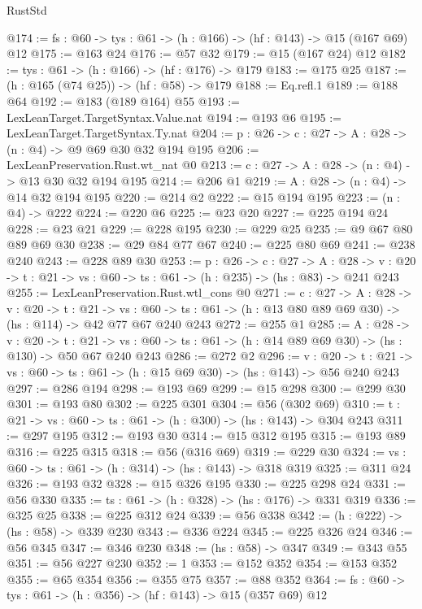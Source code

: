 \begin{lexlean}{RustStd}
\begin{coremodule}
@174 := {fs : @60} -> {tys : @61} -> (h : @166) -> (hf : @143) -> @15 (@167 @69) @12
@175 := @163 @24
@176 := @57 @32
@179 := @15 (@167 @24) @12
@182 := {tys : @61} -> (h : @166) -> (hf : @176) -> @179
@183 := @175 @25
@187 := (h : @165 (@74 @25)) -> (hf : @58) -> @179
@188 := Eq.refl.{1}
@189 := @188 @64
@192 := @183 (@189 @164) @55
@193 := LexLeanTarget.TargetSyntax.Value.nat
@194 := @193 @6
@195 := LexLeanTarget.TargetSyntax.Ty.nat
@204 := {p : @26} -> {c : @27} -> {A : @28} -> (n : @4) -> @9 @69 @30 @32 @194 @195
@206 := LexLeanPreservation.Rust.wt_nat @0
@213 := {c : @27} -> {A : @28} -> (n : @4) -> @13 @30 @32 @194 @195
@214 := @206 @1
@219 := {A : @28} -> (n : @4) -> @14 @32 @194 @195
@220 := @214 @2
@222 := @15 @194 @195
@223 := (n : @4) -> @222
@224 := @220 @6
@225 := @23 @20
@227 := @225 @194 @24
@228 := @23 @21
@229 := @228 @195
@230 := @229 @25
@235 := @9 @67 @80 @89 @69 @30
@238 := @29 @84 @77 @67
@240 := @225 @80 @69
@241 := @238 @240
@243 := @228 @89 @30
@253 := {p : @26} ->
  {c : @27} ->
  {A : @28} ->
  {v : @20} -> {t : @21} -> {vs : @60} -> {ts : @61} -> (h : @235) -> (hs : @83) -> @241 @243
@255 := LexLeanPreservation.Rust.wtl_cons @0
@271 := {c : @27} ->
  {A : @28} ->
  {v : @20} ->
  {t : @21} ->
  {vs : @60} -> {ts : @61} -> (h : @13 @80 @89 @69 @30) -> (hs : @114) -> @42 @77 @67 @240 @243
@272 := @255 @1
@285 := {A : @28} ->
  {v : @20} ->
  {t : @21} -> {vs : @60} -> {ts : @61} -> (h : @14 @89 @69 @30) -> (hs : @130) -> @50 @67 @240 @243
@286 := @272 @2
@296 := {v : @20} ->
  {t : @21} -> {vs : @60} -> {ts : @61} -> (h : @15 @69 @30) -> (hs : @143) -> @56 @240 @243
@297 := @286 @194
@298 := @193 @69
@299 := @15 @298
@300 := @299 @30
@301 := @193 @80
@302 := @225 @301
@304 := @56 (@302 @69)
@310 := {t : @21} -> {vs : @60} -> {ts : @61} -> (h : @300) -> (hs : @143) -> @304 @243
@311 := @297 @195
@312 := @193 @30
@314 := @15 @312 @195
@315 := @193 @89
@316 := @225 @315
@318 := @56 (@316 @69)
@319 := @229 @30
@324 := {vs : @60} -> {ts : @61} -> (h : @314) -> (hs : @143) -> @318 @319
@325 := @311 @24
@326 := @193 @32
@328 := @15 @326 @195
@330 := @225 @298 @24
@331 := @56 @330
@335 := {ts : @61} -> (h : @328) -> (hs : @176) -> @331 @319
@336 := @325 @25
@338 := @225 @312 @24
@339 := @56 @338
@342 := (h : @222) -> (hs : @58) -> @339 @230
@343 := @336 @224
@345 := @225 @326 @24
@346 := @56 @345
@347 := @346 @230
@348 := (hs : @58) -> @347
@349 := @343 @55
@351 := @56 @227 @230
@352 := 1
@353 := @152 @352
@354 := @153 @352
@355 := @65 @354
@356 := @355 @75
@357 := @88 @352
@364 := {fs : @60} -> {tys : @61} -> (h : @356) -> (hf : @143) -> @15 (@357 @69) @12

\end{coremodule}
\end{lexlean}
